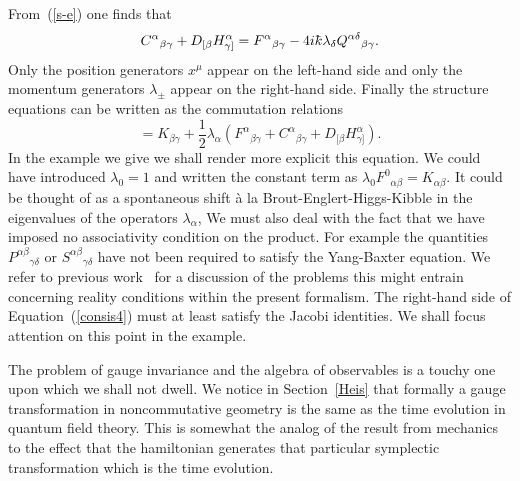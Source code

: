 \documentclass[12pt,a4paper]{article}
\newcounter{eg}
\def\kbar{{\mathchar'26\mkern-9muk}}
\begin{document}
From~(\ref{s-e}) one finds that
\begin{equation}
C^\alpha{}_{\beta \gamma} + D_{[\beta} H^\alpha_{\gamma]}
= F^\alpha{}_{\beta \gamma} -
4i\kbar \lambda_\delta Q^{\alpha\delta}{}_{\beta \gamma}.        \label{s-e2}
\end{equation}
Only the position generators $x^\mu$ appear on the left-hand side
and only the momentum generators $\lambda_\pm$ appear on the
right-hand side. Finally the structure equations can be written as
the commutation relations
\begin{equation}
[\lambda_\beta, \lambda_\gamma] = K_{\beta\gamma}
+ \frac 12 \lambda_\alpha (F^\alpha{}_{\beta \gamma} +
C^\alpha{}_{\beta \gamma} + D_{[\beta} H^\alpha_{\gamma]}).   \label{consis4}
\end{equation}
In the example we give we shall render more explicit this equation.
We could have introduced $\lambda_0 = 1$ and written the constant term
as $\lambda_0 F^0{}_{\alpha\beta} = K_{\alpha\beta}$. It could be
thought of as a spontaneous shift \`a la Brout-Englert-Higgs-Kibble in
the eigenvalues of the operators $\lambda_\alpha$, We must also deal
with the fact that we have imposed no associativity condition on the
product. For example the quantities $P^{\alpha\beta}{}_{\gamma\delta}$
or $S^{\alpha\beta}{}_{\gamma\delta}$ have not been required to
satisfy the Yang-Baxter equation. We refer to previous
work~\cite{FioMad98a} for a discussion of the problems this might
entrain concerning reality conditions within the present formalism.
The right-hand side of Equation~(\ref{consis4}) must at least satisfy
the Jacobi identities.  We shall focus attention on this point in the
example.

The problem of gauge invariance and the algebra of observables is a
touchy one upon which we shall not dwell. We notice in
Section~\ref{Heis} that formally a gauge transformation in
noncommutative geometry is the same as the time evolution in quantum
field theory. This is somewhat the analog of the result from mechanics
to the effect that the hamiltonian generates that particular
symplectic transformation which is the time evolution.
\end{document}
